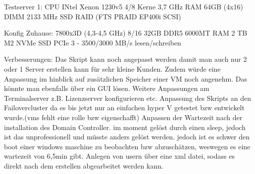 \documentclass[conference]{IEEEtran}
\begin{document}
Testserver 1:
CPU INtel Xenon 1230v5 4/8 Kerne 3,7 GHz
RAM  64GB (4x16) DIMM 2133 MHz
SSD RAID (FTS PRAID EP400i SCSI)

Konfig Zuhause:
7800x3D (4,3-4,5 GHz)  8/16
32GB DDR5 6000MT RAM
2 TB M2 NVMe SSD PCIe 3 - 3500/3000 MB/s lesen/schreiben

Verbesserungen:
Das Skript kann noch angepasst werden damit man auch nur 2 oder 1 Server erstellen kann für sehr kleine Kunden. 
Zudem würde eine Anpassung im hinblick auf zusätzlichen Speicher einer VM noch angenehm. Das könnte man ebenfalls über ein GUI lösen.
Weitere Anpassungen am Terminalserver z.B. Lizenzserver konfigurieren etc.
Anpassung des Skripts an den Failovercluster da es bis jetzt nur an einfachen hyper V getestet bzw entwickelt wurde.(vms fehlt eine rolle bzw eigenschafft)
Anpassen der Wartezeit nach der installation des Domain Controller. im moment gelöst durch einen sleep, jedoch ist das unprofessionell und müsste anders gelöst werden.
jedoch ist es schwer den boot einer windows maschine zu beobachten bzw abzuschätzen, weswegen es eine wartezeit von 6,5min gibt.
Anlegen von usern über eine xml datei, sodass es direkt nach dem erstellen abgearbeitet werden kann.



\end{document}
